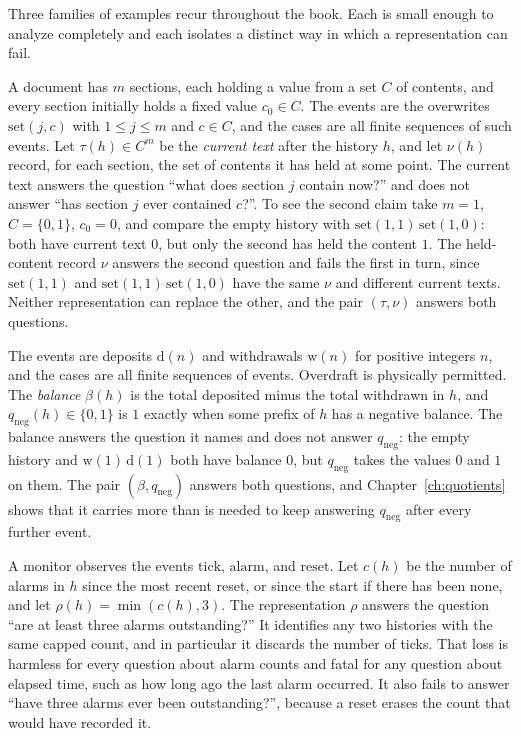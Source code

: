 Three families of examples recur throughout the book. Each is small enough to analyze completely and each isolates a distinct way in which a representation can fail.

\begin{example}\label{ex:document}
A document has $m$ sections, each holding a value from a set $C$ of contents, and every section initially holds a fixed value $c_0\in C$. The events are the overwrites $\mathrm{set}(j,c)$ with $1\le j\le m$ and $c\in C$, and the cases are all finite sequences of such events. Let $\tau(h)\in C^{m}$ be the \emph{current text} after the history $h$, and let $\nu(h)$ record, for each section, the set of contents it has held at some point. The current text answers the question ``what does section $j$ contain now?'' and does not answer ``has section $j$ ever contained $c$?''. To see the second claim take $m=1$, $C=\{0,1\}$, $c_0=0$, and compare the empty history with $\mathrm{set}(1,1)\,\mathrm{set}(1,0)$: both have current text $0$, but only the second has held the content $1$. The held-content record $\nu$ answers the second question and fails the first in turn, since $\mathrm{set}(1,1)$ and $\mathrm{set}(1,1)\,\mathrm{set}(1,0)$ have the same $\nu$ and different current texts. Neither representation can replace the other, and the pair $(\tau,\nu)$ answers both questions.
\end{example}

\begin{example}\label{ex:bank}
The events are deposits $\mathrm{d}(n)$ and withdrawals $\mathrm{w}(n)$ for positive integers $n$, and the cases are all finite sequences of events. Overdraft is physically permitted. The \emph{balance} $\beta(h)$ is the total deposited minus the total withdrawn in $h$, and $q_{\mathrm{neg}}(h)\in\{0,1\}$ is $1$ exactly when some prefix of $h$ has a negative balance. The balance answers the question it names and does not answer $q_{\mathrm{neg}}$: the empty history and $\mathrm{w}(1)\,\mathrm{d}(1)$ both have balance $0$, but $q_{\mathrm{neg}}$ takes the values $0$ and $1$ on them. The pair $(\beta,q_{\mathrm{neg}})$ answers both questions, and Chapter~\ref{ch:quotients} shows that it carries more than is needed to keep answering $q_{\mathrm{neg}}$ after every further event.
\end{example}

\begin{example}\label{ex:monitor}
A monitor observes the events $\mathrm{tick}$, $\mathrm{alarm}$, and $\mathrm{reset}$. Let $c(h)$ be the number of alarms in $h$ since the most recent reset, or since the start if there has been none, and let $\rho(h)=\min(c(h),3)$. The representation $\rho$ answers the question ``are at least three alarms outstanding?'' It identifies any two histories with the same capped count, and in particular it discards the number of ticks. That loss is harmless for every question about alarm counts and fatal for any question about elapsed time, such as how long ago the last alarm occurred. It also fails to answer ``have three alarms ever been outstanding?'', because a reset erases the count that would have recorded it.
\end{example}

